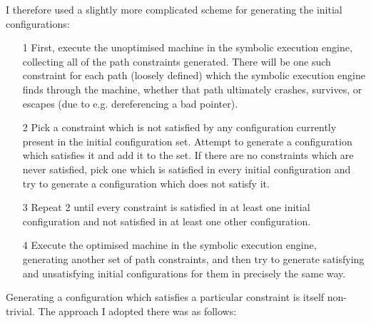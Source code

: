 I therefore used a slightly more complicated scheme for generating the
initial configurations:

\begin{itemize}
\item[1] First, execute the unoptimised machine in the symbolic
  execution engine, collecting all of the path constraints generated.
  There will be one such constraint for each path (loosely defined)
  which the symbolic execution engine finds through the machine,
  whether that path ultimately crashes, survives, or escapes (due to
  e.g. dereferencing a bad pointer).
\item[2] Pick a constraint which is not satisfied by any
  configuration currently present in the initial configuration set.
  Attempt to generate a configuration which satisfies it and add it to
  the set.  If there are no constraints which are never satisfied,
  pick one which is satisfied in every initial configuration and try
  to generate a configuration which does not satisfy it.
\item[3] Repeat 2 until every constraint is satisfied in at least one
  initial configuration and not satisfied in at least one other
  configuration.
\item[4] Execute the optimised machine in the symbolic execution
  engine, generating another set of path constraints, and then try to
  generate satisfying and unsatisfying initial configurations for them
  in precisely the same way.
\end{itemize}

Generating a configuration which satisfies a particular constraint is
itself non-trivial.  The approach I adopted there was as follows:

